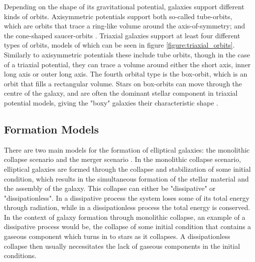 \documentclass[english, twoside]{HYgradu}
\begin{document}
Depending on the shape of its gravitational potential, galaxies support different kinds of orbits. Axisymmetric potentials support both so-called tube-orbits, which are orbits that trace a ring-like volume around the axis-of-symmetry; and the cone-shaped saucer-orbits \citep{MerrittBook}. Triaxial galaxies support at least four different types of orbits, models of which can be seen in figure \ref{figure:triaxial_orbits}. Similarly to axisymmetric potentials these include tube orbits, though in the case of a triaxial potential, they can trace a volume around either the short axis, inner long axis or outer long axis. The fourth orbital type is the box-orbit, which is an orbit that fills a rectangular volume. Stars on box-orbits can move through the centre of the galaxy, and are often the dominant stellar component in triaxial potential models, giving the "boxy" galaxies their characteristic shape \citep{BinneyTremaine}.


\subsection{Formation Models}

There are two main models for the formation of elliptical galaxies: the monolithic collapse scenario and the merger scenario \citep{GalaxyFormationAndEvo2010}. In the monolithic collapse scenario, elliptical galaxies are formed through the collapse and stabilization of some initial condition, which results in the simultaneous formation of the stellar material and the assembly of the galaxy. This collapse can either be "dissipative" or "dissipationless". In a dissipative process the system loses some of its total energy through radiation, while in a dissipationless process the total energy is conserved. In the context of galaxy formation through monolithic collapse, an example of a dissipative process would be, the collapse of some initial condition that contains a gaseous component which turns in to stars as it collapses. A dissipationless collapse then usually necessitates the lack of gaseous components in the initial conditions.
\end{document}
